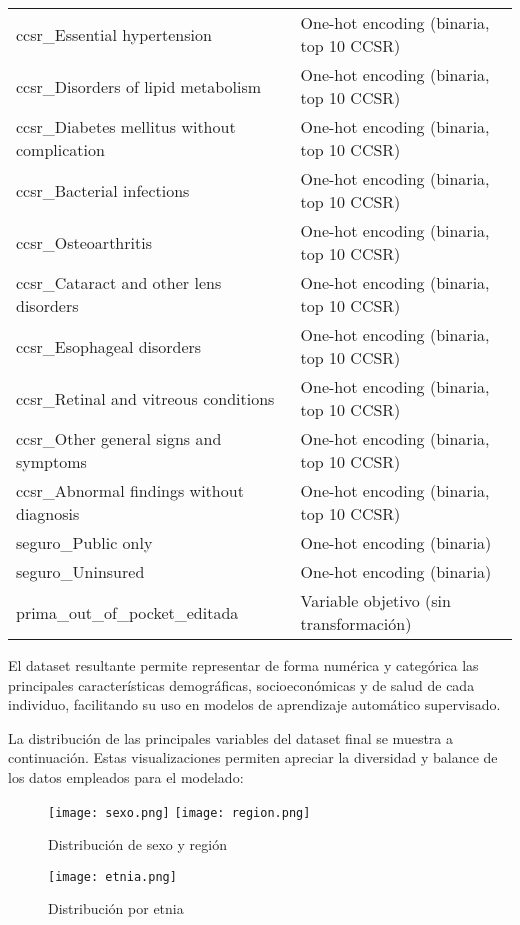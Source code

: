 \documentclass[12pt]{article}
\begin{document}
\begin{longtable}{|l|l|}
ccsr\_Essential hypertension & One-hot encoding (binaria, top 10 CCSR) \\
ccsr\_Disorders of lipid metabolism & One-hot encoding (binaria, top 10 CCSR) \\
ccsr\_Diabetes mellitus without complication & One-hot encoding (binaria, top 10 CCSR) \\
ccsr\_Bacterial infections & One-hot encoding (binaria, top 10 CCSR) \\
ccsr\_Osteoarthritis & One-hot encoding (binaria, top 10 CCSR) \\
ccsr\_Cataract and other lens disorders & One-hot encoding (binaria, top 10 CCSR) \\
ccsr\_Esophageal disorders & One-hot encoding (binaria, top 10 CCSR) \\
ccsr\_Retinal and vitreous conditions & One-hot encoding (binaria, top 10 CCSR) \\
ccsr\_Other general signs and symptoms & One-hot encoding (binaria, top 10 CCSR) \\
ccsr\_Abnormal findings without diagnosis & One-hot encoding (binaria, top 10 CCSR) \\
seguro\_Public only & One-hot encoding (binaria) \\
seguro\_Uninsured & One-hot encoding (binaria) \\
prima\_out\_of\_pocket\_editada & Variable objetivo (sin transformación) \\
\hline
\end{longtable}

El dataset resultante permite representar de forma numérica y categórica las principales características demográficas, socioeconómicas y de salud de cada individuo, facilitando su uso en modelos de aprendizaje automático supervisado.

\vspace{1em}
\noindent
La distribución de las principales variables del dataset final se muestra a continuación. Estas visualizaciones permiten apreciar la diversidad y balance de los datos empleados para el modelado:

\begin{figure}[h!]
    \centering
    \texttt{[image: sexo.png]}
    \texttt{[image: region.png]}
    \caption{Distribución de sexo y región}
\end{figure}

\begin{figure}[h!]
    \centering
    \texttt{[image: etnia.png]}
    
    \caption{Distribución por etnia}
\end{figure}
\end{document}
